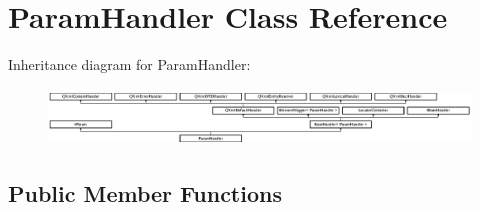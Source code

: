 \hypertarget{class_param_handler}{}\section{Param\+Handler Class Reference}
\label{class_param_handler}
Inheritance diagram for Param\+Handler\+:\begin{figure}[H]
\begin{center}
\leavevmode
\includegraphics[height=1.502347cm]{class_param_handler}
\end{center}
\end{figure}
\subsection*{Public Member Functions}
